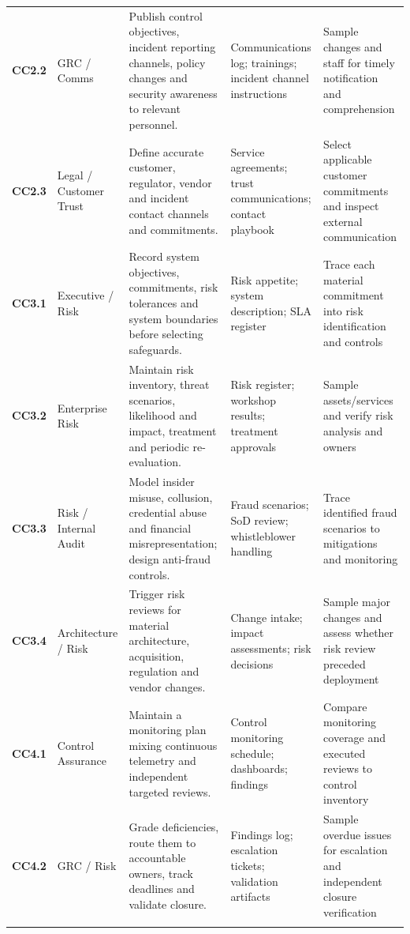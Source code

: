 \documentclass[10pt,oneside]{report}
\begin{document}
\begin{landscape}
\begin{longtable}{@{}>{\raggedright\arraybackslash}p{0.6in}>{\raggedright\arraybackslash}p{1.0in}>{\raggedright\arraybackslash}p{2.5in}>{\raggedright\arraybackslash}p{2.35in}>{\raggedright\arraybackslash}p{2.20in}@{}}
\addlinespace[5pt]
\textbf{CC2.2} & GRC / Comms & Publish control objectives, incident reporting channels, policy changes and security awareness to relevant personnel. & Communications log; trainings; incident channel instructions & Sample changes and staff for timely notification and comprehension \\
\addlinespace[5pt]
\textbf{CC2.3} & Legal / Customer Trust & Define accurate customer, regulator, vendor and incident contact channels and commitments. & Service agreements; trust communications; contact playbook & Select applicable customer commitments and inspect external communication \\
\addlinespace[5pt]
\textbf{CC3.1} & Executive / Risk & Record system objectives, commitments, risk tolerances and system boundaries before selecting safeguards. & Risk appetite; system description; SLA register & Trace each material commitment into risk identification and controls \\
\addlinespace[5pt]
\textbf{CC3.2} & Enterprise Risk & Maintain risk inventory, threat scenarios, likelihood and impact, treatment and periodic re-evaluation. & Risk register; workshop results; treatment approvals & Sample assets/services and verify risk analysis and owners \\
\addlinespace[5pt]
\textbf{CC3.3} & Risk / Internal Audit & Model insider misuse, collusion, credential abuse and financial misrepresentation; design anti-fraud controls. & Fraud scenarios; SoD review; whistleblower handling & Trace identified fraud scenarios to mitigations and monitoring \\
\addlinespace[5pt]
\textbf{CC3.4} & Architecture / Risk & Trigger risk reviews for material architecture, acquisition, regulation and vendor changes. & Change intake; impact assessments; risk decisions & Sample major changes and assess whether risk review preceded deployment \\
\addlinespace[5pt]
\textbf{CC4.1} & Control Assurance & Maintain a monitoring plan mixing continuous telemetry and independent targeted reviews. & Control monitoring schedule; dashboards; findings & Compare monitoring coverage and executed reviews to control inventory \\
\addlinespace[5pt]
\textbf{CC4.2} & GRC / Risk & Grade deficiencies, route them to accountable owners, track deadlines and validate closure. & Findings log; escalation tickets; validation artifacts & Sample overdue issues for escalation and independent closure verification \\
\addlinespace[5pt]

\end{longtable}
\end{landscape}
\end{document}

